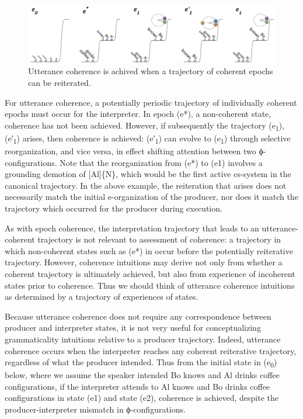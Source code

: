 \begin{figure}
\includegraphics[width=\textwidth]{figures/Tilsen-img125.png}
\caption{Utterance coherence is achived when a trajectory of coherent epochs can be reiterated.}
\label{fig:6:6}
\end{figure}
 
  For utterance coherence, a potentially periodic trajectory of individually coherent epochs must occur for the interpreter. In epoch (e*), a non-coherent state, coherence has not been achieved. However, if subsequently the trajectory (e\textsubscript{1}), (e′\textsubscript{1}) arises, then coherence is achieved: (e′\textsubscript{1}) can evolve to (e\textsubscript{1}) through selective reorganization, and vice versa, in effect shifting attention between two ϕ-configurations. Note that the reorganization from (e*) to (e1) involves a grounding demotion of [Al]\{N\}, which would be the first active cs-system in the canonical trajectory. In the above example, the reiteration that arises does not necessarily match the initial e-organization of the producer, nor does it match the trajectory which occurred for the producer during execution.

  As with epoch coherence, the interpretation trajectory that leads to an utterance-coherent trajectory is not relevant to assessment of coherence: a trajectory in which non-coherent states such as (e*) in {} occur before the potentially reiterative trajectory. However, coherence intuitions may derive not only from whether a coherent trajectory is ultimately achieved, but also from experience of incoherent states prior to coherence. Thus we should think of utterance coherence intuitions as determined by a trajectory of experiences of states.

  Because utterance coherence does not require any correspondence between producer and interpreter states, it is not very useful for conceptualizing grammaticality intuitions relative to a producer trajectory. Indeed, utterance coherence occurs when the interpreter reaches any coherent reiterative trajectory, regardless of what the producer intended. Thus from the initial state in (e\textsubscript{0}) below, where we assume the speaker intended {\textbar}Bo knows{\textbar} and {\textbar}Al drinks coffee{\textbar} configurations, if the interpreter attends to {\textbar}Al knows{\textbar} and {\textbar}Bo drinks coffee{\textbar} configurations in state (e1) and state (e2), coherence is achieved, despite the producer-interpreter mismatch in ϕ-configurations.

